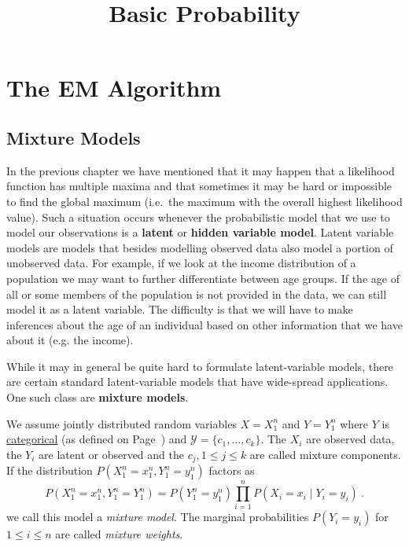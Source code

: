 \documentclass[a4paper,11pt,leqno]{report}\usepackage[]{graphicx}\usepackage[]{color}
\title{Basic Probability}
\date{}
\begin{document}
\setcounter{chapter}{5}



\chapter{The EM Algorithm}

\section{Mixture Models}\label{sec:mixtureModels}

In the previous chapter we have mentioned that it may happen that a likelihood function has multiple 
maxima and that sometimes it may be hard or impossible to find the global maximum (i.e.\ the maximum
with the overall highest likelihood value). Such a situation occurs whenever the probabilistic model
that we use to model our observations is a \textbf{latent} or \textbf{hidden variable model}. Latent variable
models are models that besides modelling observed data also model a portion of unobserved data. For
example, if we look at the income distribution of a population we may want to further differentiate
between age groups. If the age of all or some members of the population is not provided in the data, we
can still model it as a latent variable. The difficulty is that we will have to make inferences about the
age of an individual based on other information that we have about it (e.g. the income). 

While it may in general be quite hard to formulate latent-variable models, there are certain standard
latent-variable models that have wide-spread applications. One such class are \textbf{mixture models}.

\begin{Definition}\label{def:mixtureModel}
We assume jointly distributed random variables $ X=X_{1}^{n} $ and $
Y=Y_{1}^{n} $ where $ Y $ is \href{https://en.wikipedia.org/wiki/Categorical_variable}{categorical} (as defined on Page~\pageref{lab:categorical}) and
$ \mathcal{Y} = \{c_{1}, \ldots, c_{k}\} $. The $ X_{i} $ are observed data, the $ Y_{i} $ are latent
or observed and the $ c_{j}, 1\leq j \leq k $ are called mixture components. 
If the distribution
$ P(X_{1}^{n}=x_{1}^{n}, Y_{1}^{n} = y_{1}^{n}) $ factors as
$$ P(X_{1}^{n}=x_{1}^{n}, Y_{1}^{n} = Y_{1}^{n})= P(Y_{1}^{n} = y_{1}^{n}) \prod_{i=1}^{n} P(X_{i}=x_{i} \mid Y_{i} = y_{i}) \ . $$
we call this model a \emph{mixture model}. The marginal probabilities $ P(Y_{i}=y_{i}) $ for $ 1 \leq i \leq n $ are called
\emph{mixture weights}.
\end{Definition}
\end{document}
